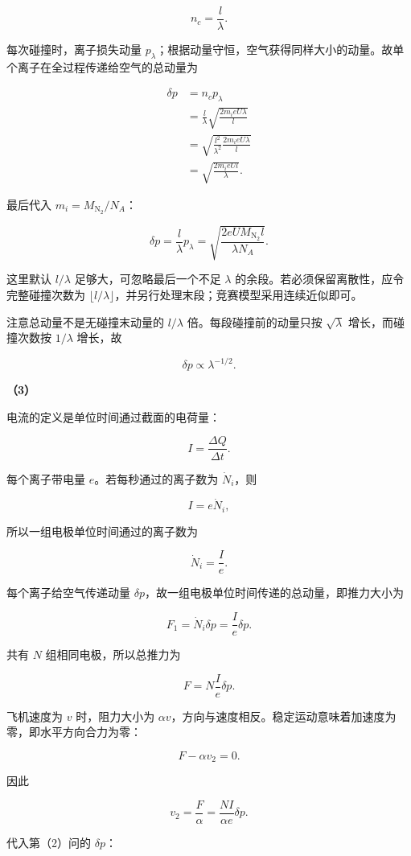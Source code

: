 \documentclass[12pt,a4paper,UTF8]{ctexart}
\begin{document}
\[n_c=\frac l\lambda.\]

每次碰撞时，离子损失动量
\(p_\lambda\)；根据动量守恒，空气获得同样大小的动量。故单个离子在全过程传递给空气的总动量为

\[\begin{aligned}
\delta p
&=n_cp_\lambda\\
&=\frac l\lambda
\sqrt{\frac{2m_ieU\lambda}{l}}\\
&=\sqrt{\frac{l^2}{\lambda^2}
\frac{2m_ieU\lambda}{l}}\\
&=\sqrt{\frac{2m_ieUl}{\lambda}}.
\end{aligned}\]

最后代入 \(m_i=M_{\mathrm{N_2}}/N_A\)：

\[\delta p=\frac{l}{\lambda}p_\lambda
=\boxed{\sqrt{\frac{2eUM_{\mathrm{N_2}}l}{\lambda N_A}}}.\]

这里默认 \(l/\lambda\) 足够大，可忽略最后一个不足 \(\lambda\)
的余段。若必须保留离散性，应令完整碰撞次数为
\(\lfloor l/\lambda\rfloor\)，并另行处理末段；竞赛模型采用连续近似即可。

注意总动量不是无碰撞末动量的 \(l/\lambda\) 倍。每段碰撞前的动量只按
\(\sqrt{\lambda}\) 增长，而碰撞次数按 \(1/\lambda\) 增长，故

\[\delta p\propto\lambda^{-1/2}.\]

\textbf{（3）}

电流的定义是单位时间通过截面的电荷量：

\[I=\frac{\Delta Q}{\Delta t}.\]

每个离子带电量 \(e\)。若每秒通过的离子数为 \(\dot N_i\)，则

\[I=e\dot N_i,\]

所以一组电极单位时间通过的离子数为

\[\dot N_i=\frac Ie.\]

每个离子给空气传递动量
\(\delta p\)，故一组电极单位时间传递的总动量，即推力大小为

\[F_1=\dot N_i\delta p=\frac Ie\delta p.\]

共有 \(N\) 组相同电极，所以总推力为

\[F=N\frac{I}{e}\delta p.\]

飞机速度为 \(v\) 时，阻力大小为
\(\alpha v\)，方向与速度相反。稳定运动意味着加速度为零，即水平方向合力为零：

\[F-\alpha v_2=0.\]

因此

\[v_2=\frac F\alpha
=\frac{NI}{\alpha e}\delta p.\]

代入第（2）问的 \(\delta p\)：
\end{document}
